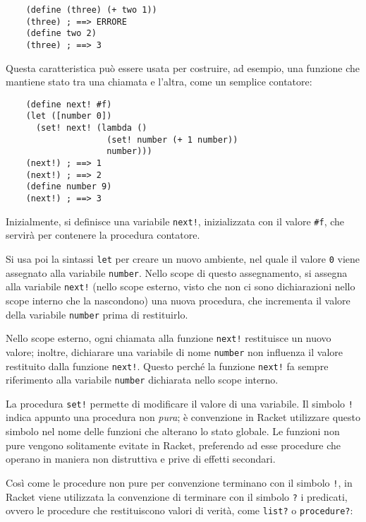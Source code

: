 \begin{lstlisting}
    (define (three) (+ two 1))
    (three) ; ==> ERRORE
    (define two 2)
    (three) ; ==> 3
\end{lstlisting}

Questa caratteristica pu\`o essere usata per costruire, ad esempio, una
funzione che mantiene stato tra una chiamata e l'altra, come un semplice
contatore:

\begin{lstlisting}
    (define next! #f)
    (let ([number 0])
      (set! next! (lambda ()
                    (set! number (+ 1 number))
                    number)))
    (next!) ; ==> 1
    (next!) ; ==> 2
    (define number 9)
    (next!) ; ==> 3
\end{lstlisting}

Inizialmente, si definisce una variabile \lstinline{next!}, inizializzata
con il valore \lstinline{#f}, che servir\`a per contenere la procedura
contatore.

Si usa poi la sintassi \lstinline{let} per creare un nuovo ambiente,
nel quale il valore \lstinline{0} viene assegnato alla variabile
\lstinline{number}. Nello scope di questo assegnamento, si assegna
alla variabile \lstinline{next!} (nello scope esterno, visto che non ci
sono dichiarazioni nello scope interno che la nascondono) una nuova
procedura, che incrementa il valore della variabile \lstinline{number}
prima di restituirlo.

Nello scope esterno, ogni chiamata alla funzione \lstinline{next!}
restituisce un nuovo valore; inoltre, dichiarare una variabile di nome
\lstinline{number} non influenza il valore restituito dalla
funzione \lstinline{next!}. Questo perch\'e la funzione \lstinline{next!}
fa sempre riferimento alla variabile \lstinline{number} dichiarata
nello scope interno.

La procedura \lstinline{set!} permette di modificare il valore di una
variabile. Il simbolo \lstinline{!} indica appunto una procedura non
\emph{pura}; \`e convenzione in Racket utilizzare questo simbolo nel
nome delle funzioni che alterano lo stato globale. Le funzioni non
pure vengono solitamente evitate in Racket, preferendo ad esse procedure
che operano in maniera non distruttiva e prive di effetti secondari.

Cos\`i come le procedure non pure per convenzione terminano con il
simbolo \lstinline{!}, in Racket viene utilizzata la convenzione di
terminare con il simbolo \lstinline{?} i predicati, ovvero le procedure
che restituiscono valori di verit\`a, come \lstinline{list?} o
\lstinline{procedure?}:

